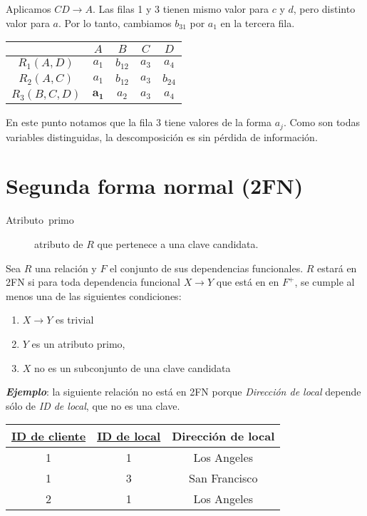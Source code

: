 \documentclass[a4paper, twoside]{article}
\begin{document}
Aplicamos $CD\to A$. Las filas 1 y 3 tienen mismo valor para $c$
y $d$, pero distinto valor para $a$. Por lo tanto, cambiamos $b_{31}$
por $a_{1}$ en la tercera fila.

\noindent \begin{center}
\begin{tabular}{|c|c|c|c|c|}
\hline 
 & $A$ & $B$ & $C$ & $D$\\
\hline 
\hline 
$R_{1}(A,D)$ & $a_{1}$ & $b_{12}$ & $a_{3}$ & $a_{4}$\\
\hline 
$R_{2}(A,C)$ & $a_{1}$ & $b_{12}$ & $a_{3}$ & $b_{24}$\\
\hline 
$R_{3}(B,C,D)$ & $\mathbf{a_{1}}$ & $a_{2}$ & $a_{3}$ & \textbf{$a_{4}$}\\
\hline 
\end{tabular}
\par\end{center}

En este punto notamos que la fila 3 tiene valores de la forma $a_{j}$.
Como son todas variables distinguidas, la descomposición es sin pérdida
de información.


\section{Segunda forma normal (2FN)}
\begin{description}
\item [{Atributo~primo}] atributo de $R$ que pertenece a una clave candidata.
\end{description}
Sea $R$ una relación y $F$ el conjunto de sus dependencias funcionales.
$R$ estará en 2FN si para toda dependencia funcional $X\to Y$ que
está en en $F^{+}$, se cumple al menos una de las siguientes condiciones:
\begin{enumerate}
\item $X\to Y$ es trivial
\item $Y$ es un atributo primo,
\item $X$ no es un subconjunto de una clave candidata
\end{enumerate}
\textbf{\emph{Ejemplo}}: la siguiente relación no está en 2FN porque
\emph{Dirección de local} depende sólo de \emph{ID de local}, que
no es una clave.

\noindent \begin{center}
\begin{tabular}{|c|c|c|}
\hline 
\uline{ID de cliente} & \uline{ID de local} & Dirección de local\\
\hline 
\hline 
1 & 1 & Los Angeles\\
\hline 
1 & 3 & San Francisco\\
\hline 
2 & 1 & Los Angeles\\
\hline 
\end{tabular}
\par\end{center}
\end{document}
